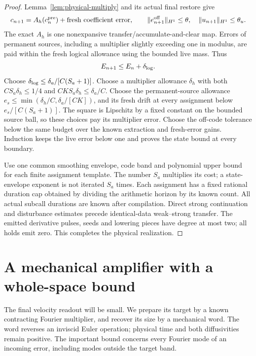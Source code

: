 \documentclass[11pt,a4paper]{amsart}
\theoremstyle{definition}
\theoremstyle{remark}
\numberwithin{equation}{section}
\newcommand{\norm}[1]{\lVert #1\rVert}
\begin{document}
\begin{proof}
Lemma~\ref{lem:physical-multiply} and its actual final restore give
\[
 c_{n+1}=A_h(c_n^{\rm pre})+\text{fresh coefficient error},\qquad
 \norm{e_{n+1}^{\rm off}}_{H^1}\le\theta,
 \quad\norm{u_{n+1}}_{H^1}\le\theta_u.
\]
The exact $A_h$ is one nonexpansive transfer/accumulate-and-clear map.
Errors of permanent sources, including a multiplier slightly exceeding
one in modulus, are paid within the fresh logical allowance using the
bounded live mass.  Thus
\begin{equation}\label{eq:physical-logical-recurrence}
 E_{n+1}\le E_n+\delta_{\rm log}.
\end{equation}
Choose $\delta_{\rm log}\le\delta_a/[C(S_a+1)]$. Choose a multiplier
allowance $\delta_h$ with both
$CS_a\delta_h\le1/4$ and $CKS_a\delta_h\le\delta_a/C$.
Choose the permanent-source allowance
$e_s\le\min(\delta_h/C,\delta_a/[CK])$, and its fresh drift at every
assignment below $e_s/[C(S_a+1)]$. The square is Lipschitz by a fixed
constant on the bounded source ball, so these choices pay its multiplier
error. Choose the off-code tolerance below
the same budget over the known extraction and fresh-error gains.
Induction keeps the live error below one and proves the state bound at
every boundary.

Use one common smoothing envelope, code band and polynomial upper bound
for each finite assignment template.  The number $S_a$ multiplies its
cost; a state-envelope exponent is not iterated $S_a$ times.  Each
assignment has a fixed rational duration cap obtained by dividing the
arithmetic horizon by its known count.  All actual subcall durations are
known after compilation.  Direct strong continuation and disturbance
estimates precede identical-data weak--strong transfer.  The emitted
derivative pulses, seeds and lowering pieces have degree at most two;
all holds emit zero.  This completes the physical realization.
\end{proof}

\section{A mechanical amplifier with a whole-space bound}\label{sec:amplifier}
The final velocity readout will be small.  We prepare its target by a
known contracting Fourier multiplier, and recover its size by a mechanical
word.  The word reverses an inviscid Euler operation; physical time and
both diffusivities remain positive.  The important bound concerns every
Fourier mode of an incoming error, including modes outside the target band.
\end{document}
